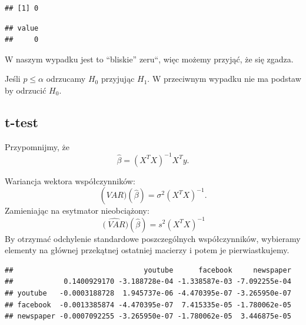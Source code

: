 \documentclass[]{article}
\newenvironment{Shaded}{\begin{snugshade}}{\end{snugshade}}
\newcommand{\KeywordTok}[1]{\textcolor[rgb]{0.13,0.29,0.53}{\textbf{#1}}}
\newcommand{\DecValTok}[1]{\textcolor[rgb]{0.00,0.00,0.81}{#1}}
\newcommand{\StringTok}[1]{\textcolor[rgb]{0.31,0.60,0.02}{#1}}
\newcommand{\OperatorTok}[1]{\textcolor[rgb]{0.81,0.36,0.00}{\textbf{#1}}}
\newcommand{\NormalTok}[1]{#1}
\begin{document}
\begin{verbatim}
## [1] 0
\end{verbatim}

\begin{Shaded}
\end{Shaded}

\begin{verbatim}
## value 
##     0
\end{verbatim}

W naszym wypadku jest to ``bliskie'' zeru``, więc możemy przyjąć, że się
zgadza.

Jeśli \(p\leqslant \alpha\) odrzucamy \(H_0\) przyjując \(H_1\). W
przeciwnym wypadku nie ma podstaw by odrzucić \(H_0\).

\subsection{t-test}\label{t-test}

Przypomnijmy, że \[\hat{\beta}= ( X^T X )^{-1}  X^T  y.\]

Wariancja wektora współczynników:
\[\operatorname(VAR) (\hat{\beta}) = \sigma^2 (X^TX)^{-1}.\] Zamieniając
na esytmator nieobciążony:
\[\widehat{\operatorname(VAR)}(\hat{\beta}) = s^2 (X^TX)^{-1} \] By
otrzymać odchylenie standardowe poszczególnych współczynników, wybieramy
elementy na głównej przekątnej ostatniej macierzy i potem je
pierwiastkujemy.

\begin{Shaded}
\end{Shaded}

\begin{verbatim}
##                               youtube      facebook     newspaper
##            0.1400929170 -3.188728e-04 -1.338587e-03 -7.092255e-04
## youtube   -0.0003188728  1.945737e-06 -4.470395e-07 -3.265950e-07
## facebook  -0.0013385874 -4.470395e-07  7.415335e-05 -1.780062e-05
## newspaper -0.0007092255 -3.265950e-07 -1.780062e-05  3.446875e-05
\end{verbatim}
\end{document}
